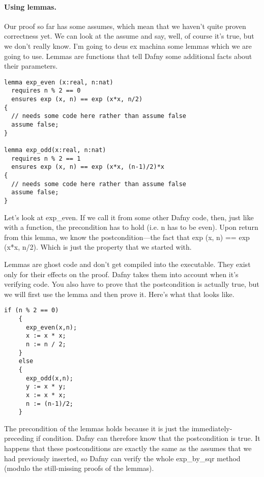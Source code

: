 \documentclass[11pt]{article}
\begin{document}
\paragraph{Using lemmas.} Our proof so far has some \textsf{assumes}, which mean that we haven't quite proven correctness yet.
We can look at the assume and say, well, of course it's true, but we don't really know.
I'm going to deus ex machina some lemmas which we are going to use. Lemmas are functions that tell Dafny some additional facts about their parameters.

\begin{lstlisting}[language=dafny]
lemma exp_even (x:real, n:nat)
  requires n % 2 == 0
  ensures exp (x, n) == exp (x*x, n/2)
{
  // needs some code here rather than assume false
  assume false;
}

lemma exp_odd(x:real, n:nat)
  requires n % 2 == 1
  ensures exp (x, n) == exp (x*x, (n-1)/2)*x
{
  // needs some code here rather than assume false
  assume false;
}
\end{lstlisting}

Let's look at \textsf{exp\_even}. If we call it from some other Dafny code, then, just like with a function, the precondition
has to hold (i.e. \textsf{n} has to be even). Upon return from this lemma, we know the postcondition---the fact that
\textsf{exp (x, n) == exp (x*x, n/2)}. Which is just the property that we started with.

Lemmas are ghost code and don't get compiled into the executable. They exist only for their effects on the proof.
Dafny takes them into account when it's verifying code. You also have to prove that the postcondition is actually true,
but we will first use the lemma and then prove it. Here's what that looks like.

\begin{lstlisting}[language=dafny]
    if (n % 2 == 0)
    {
      exp_even(x,n);
      x := x * x;
      n := n / 2;
    }
    else
    {
      exp_odd(x,n);
      y := x * y;
      x := x * x;
      n := (n-1)/2;
    }
\end{lstlisting}

The precondition of the lemmas holds because it is just the immediately-preceding \textsf{if} condition.
Dafny can therefore know that the postcondition is true. It happens that these postconditions are exactly the
same as the \textsf{assume}s that we had previously inserted, so Dafny can verify the whole \textsf{exp\_by\_sqr}
method (modulo the still-missing proofs of the lemmas).
\end{document}
